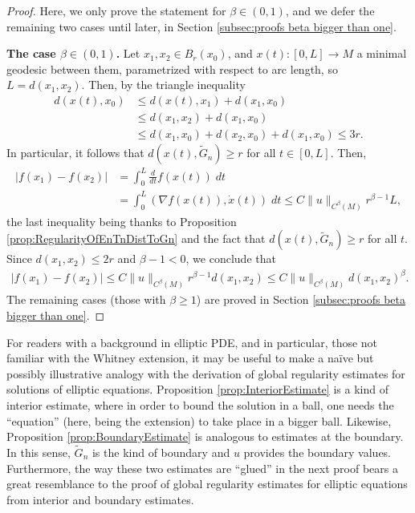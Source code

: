 \documentclass[11pt,reqno]{amsart}
\numberwithin{equation}{section}
\theoremstyle{plain}
\begin{document}
\begin{proof}
	Here, we only prove the statement for $\beta\in(0,1)$, and we defer the remaining two cases until later, in Section \ref{subsec:proofs beta bigger than one}.
  
  
  \textbf{The case $\beta \in (0,1)$.} Let $x_1,x_2 \in B_r(x_0)$, and $x(t):[0,L]\to M$ a minimal geodesic between them, parametrized with respect to arc length, so $L = d(x_1,x_2)$. Then, by the triangle inequality
  \begin{align*}
    d(x(t),x_0) & \leq d(x(t),x_1)+d(x_1,x_0) \\
	  & \leq d(x_1,x_2)+d(x_1,x_0)\\
	  & \leq d(x_1,x_0)+d(x_2,x_0)+d(x_1,x_0) \leq 3r.	  
  \end{align*}	  
  In particular, it follows that $d(x(t),\tilde G_n) \geq r$ for all $t\in [0,L]$. Then,
  \begin{align*}
    |f(x_1)-f(x_2)| & = \int_0^L \frac{d}{dt}f(x(t))\;dt\\
	  & = \int_0^L(\nabla f(x(t)),\dot x(t))\;dt \leq C\|u\|_{C^\beta(M)}r^{\beta-1}L,
  \end{align*}
  the last inequality being thanks to Proposition \ref{prop:RegularityOfEnTnDistToGn} and the fact that $d(x(t),\tilde G_n)\geq r$ for all $t$. Since $d(x_1,x_2)\leq 2r$ and $\beta-1<0$, we conclude that
  \begin{align*}
    |f(x_1)-f(x_2)| \leq C\|u\|_{C^\beta(M)}r^{\beta-1}d(x_1,x_2) \leq C\|u\|_{C^\beta(M)}d(x_1,x_2)^{\beta}.
  \end{align*}
  The remaining cases (those with $\beta\geq 1$) are proved in Section \ref{subsec:proofs beta bigger than one}.
\end{proof}

For readers with a background in elliptic PDE, and in particular, those not familiar with the Whitney extension, it may be useful to make a na\"ive but possibly illustrative analogy with the derivation of global regularity estimates for solutions of elliptic equations.  Proposition \ref{prop:InteriorEstimate} is a kind of interior estimate, where in order to bound the solution in a ball, one needs the ``equation'' (here, being the extension) to take place in a bigger ball. Likewise, Proposition \ref{prop:BoundaryEstimate} is analogous to estimates at the boundary. In this sense, $\tilde G_n$ is the kind of boundary and $u$ provides the boundary values. Furthermore, the way these two estimates are ``glued'' in the next proof bears a great resemblance to the proof of global regularity estimates for elliptic equations from interior and boundary estimates.
\end{document}
